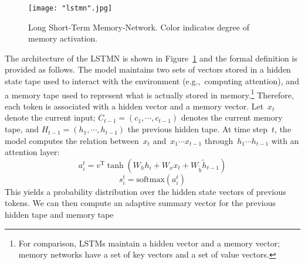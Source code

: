 \documentclass[11pt,letterpaper]{article}
\begin{document}
			\begin{figure}[t]
				\begin{center}
					\hspace*{-1.5ex}\texttt{[image: "lstmn".jpg]}
				\end{center}
				\caption{\label{lstmn} Long Short-Term Memory-Network. Color indicates degree of memory activation.}
				\vspace{-2.5ex}
			\end{figure}

                        The architecture of the LSTMN is shown in
                        Figure~\ref{lstmn} and the formal definition
                        is provided as follows.  The model maintains
                        two sets of vectors stored in a hidden state
                        tape used to interact with the environment
                        (e.g.,~computing attention), and a memory tape
                        used to represent what is actually stored in
                        memory.\footnote{For comparison, LSTMs maintain a hidden
                          vector and a memory vector; memory networks
                          \cite{weston2014memory} have a set of key
                          vectors and a set of value vectors.}
                        Therefore, each token is associated with a
                        hidden vector and a memory vector.  Let~$x_t$
                        denote the current input; $C_{t-1} = (c_1,
                        \cdots, c_{t-1})$ denotes the current memory
                        tape, and $H_{t-1} = (h_1, \cdots, h_{t-1})$
                        the previous hidden tape.  At time step~$t$,
                        the model computes the relation between~$x_t$
                        and~$x_1\cdots x_{t-1}$ through~$h_1 \cdots
                        h_{t-1}$ with an attention layer:
                        \begin{equation}
                        a_i^t = v^\text{T} \tanh(W_h h_i + W_x x_t + W_{\tilde{h}} \tilde{h}_{t-1})
                        \label{intraatt}
                        \end{equation}
                        \begin{equation}
                        s_i^t = \text{softmax} (a_i^t)
                        \label{softmax}
                        \end{equation}
                        This yields a probability distribution over the hidden state vectors of previous tokens.
                        We can then compute an adaptive summary vector for the previous hidden tape and memory tape
\end{document}
